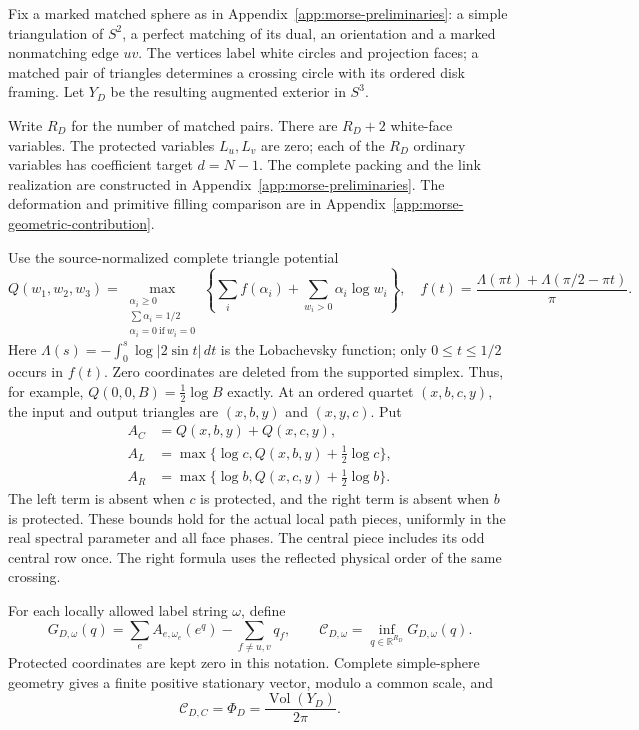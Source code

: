 Fix a marked matched sphere as in
Appendix~\ref{app:morse-preliminaries}: a simple triangulation of
$S^2$, a perfect matching of its dual, an orientation and a marked
nonmatching edge $uv$. The vertices label white circles and projection
faces; a matched pair of triangles determines a crossing circle with
its ordered disk framing. Let $Y_D$ be the resulting augmented exterior
in $S^3$.

Write $R_D$ for the number of matched pairs. There are $R_D+2$
white-face variables. The protected variables $L_u,L_v$ are zero;
each of the $R_D$ ordinary variables has coefficient target $d=N-1$.
The complete packing and the link realization are constructed in
Appendix~\ref{app:morse-preliminaries}. The deformation and primitive
filling comparison are in Appendix~\ref{app:morse-geometric-contribution}.

Use the source-normalized complete triangle potential \begin{equation}\label{pts:eq-1}
Q(w_1,w_2,w_3)=
 \max_{\substack{\alpha_i\ge0\\\sum\alpha_i=1/2\\
                  \alpha_i=0\ \text{if}\ w_i=0}}
 \left\{\sum_i f(\alpha_i)+\sum_{w_i>0}\alpha_i\log w_i\right\},
 \quad
 f(t)=\frac{\Lambda(\pi t)+\Lambda(\pi/2-\pi t)}{\pi}.
\end{equation} Here \(\Lambda(s)=-\int_0^s\log|2\sin t|\,dt\) is the Lobachevsky
function; only \(0\le t\le1/2\) occurs in \(f(t)\). Zero coordinates are
deleted from the supported simplex. Thus, for example,
\(Q(0,0,B)=\tfrac12\log B\) exactly. At an ordered quartet
\((x,b,c,y)\), the input and output triangles are \((x,b,y)\) and
\((x,y,c)\). Put \begin{equation}\label{pts:eq-2}
\begin{split}
 A_C&=Q(x,b,y)+Q(x,c,y),\\
 A_L&=\max\{\log c,Q(x,b,y)+\tfrac12\log c\},\\
 A_R&=\max\{\log b,Q(x,c,y)+\tfrac12\log b\}.
 \end{split}
\end{equation} The left term is absent when \(c\) is protected, and the right
term is absent when \(b\) is protected. These bounds hold for the actual
local path pieces, uniformly in the real spectral parameter and all
face phases. The central piece includes its odd central row once.
The right formula uses the reflected physical order of the same crossing.

For each locally allowed label string \(\omega\), define \begin{equation}\label{pts:eq-3}
G_{D,\omega}(q)
       =\sum_e A_{e,\omega_e}(e^q)-\sum_{f\ne u,v}q_f,
 \qquad
 \mathcal C_{D,\omega}=\inf_{q\in\mathbb R^{R_D}}G_{D,\omega}(q).
\end{equation} Protected coordinates are kept zero in this notation. Complete
simple-sphere geometry gives a finite positive stationary vector, modulo
a common scale, and \begin{equation}\label{pts:eq-4}
\mathcal C_{D,C}=\Phi_D
        =\frac{\operatorname{Vol}(Y_D)}{2\pi}.
\end{equation}

